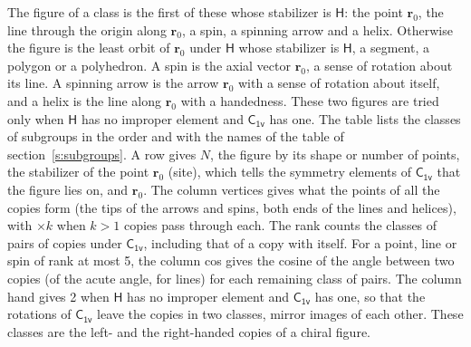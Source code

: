 \documentclass[10pt,a4paper]{article}
\numberwithin{equation}{section}
\newcommand{\grp}[1]{\mathsf{#1}}
\newcommand{\pointr}{\mathbf{r}}
\begin{document}
\leavevmode\label{n:head.figure}The figure of a class is the first of these whose stabilizer is $\grp{H}$: the point $\pointr_0$, the line through the origin along $\pointr_0$, a spin, a spinning arrow and a helix. Otherwise the figure is the least orbit of $\pointr_0$ under $\grp{H}$ whose stabilizer is $\grp{H}$, a segment, a polygon or a polyhedron. A spin is the axial vector $\pointr_0$, a sense of rotation about its line. A spinning arrow is the arrow $\pointr_0$ with a sense of rotation about itself, and a helix is the line along $\pointr_0$ with a handedness. These two figures are tried only when $\grp{H}$ has no improper element and $\grp{C_{1v}}$ has one. The table lists the classes of subgroups in the order and with the names of the table of section~\ref{s:subgroups}. \label{n:head.site}A row gives $N$, the figure by its shape or number of points, the stabilizer of the point $\pointr_0$ (site), which tells the symmetry elements of $\grp{C_{1v}}$ that the figure lies on, and $\pointr_0$. \label{n:head.vertices}The column vertices gives what the points of all the copies form (the tips of the arrows and spins, both ends of the lines and helices), with ${\times}k$ when $k > 1$ copies pass through each. \label{n:head.rank}The rank counts the classes of pairs of copies under $\grp{C_{1v}}$, including that of a copy with itself. \label{n:head.cos}For a point, line or spin of rank at most 5, the column cos gives the cosine of the angle between two copies (of the acute angle, for lines) for each remaining class of pairs. \label{n:head.hand}The column hand gives 2 when $\grp{H}$ has no improper element and $\grp{C_{1v}}$ has one, so that the rotations of $\grp{C_{1v}}$ leave the copies in two classes, mirror images of each other. These classes are the left- and the right-handed copies of a chiral figure.
\end{document}
